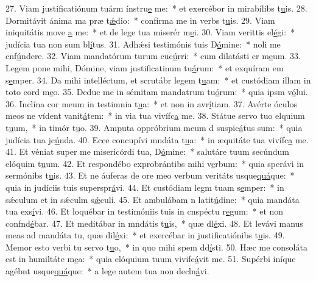 27. Viam justificatiónum tuárm ínstru\uline{e} me:~* et exercébor in mirabílibs t\uline{u}is.
28. Dormitávit ánima ma præ t\uline{ǽ}dio:~* confírma me in verbs t\uline{u}is.
29. Viam iniquitátis move \uline{a} me:~* et de lege tua miserér m\uline{e}i.
30. Viam verittis el\uline{é}gi:~* judícia tua non sum bl\uline{í}tus.
31. Adhǽsi testimónis tuis D\uline{ó}mine:~* noli me cnf\uline{ú}ndere.
32. Viam mandatórum turum cuc\uline{ú}rri:~* cum dilatásti cr m\uline{e}um.
33. Legem pone mihi, Dómine, viam justificatinum tu\uline{á}rum:~* et exquíram em s\uline{e}mper.
34. Da mihi intelléctum, et scrutábr legem t\uline{u}am:~* et custódiam illam in toto cord m\uline{e}o.
35. Deduc me in sémitam mandatrum tu\uline{ó}rum:~* quia ipsm v\uline{ó}lui.
36. Inclína cor meum in testimnia t\uline{u}a:~* et non in avr\uline{í}tiam.
37. Avérte óculos meos ne vídent vanit\uline{á}tem:~* in via tua vivífc\uline{a} me.
38. Státue servo tuo elquium t\uline{u}um,~* in timór t\uline{u}o.
39. Amputa oppróbrium meum d suspic\uline{á}tus sum:~* quia judícia tua jc\uline{ú}nda.
40. Ecce concupívi mndáta t\uline{u}a:~* in æquitáte tua vivífc\uline{a} me.
41. Et véniat super me misericórdi tua, D\uline{ó}mine:~* salutáre tuum secúndum elóquim t\uline{u}um.
42. Et respondébo exprobrántibs mihi v\uline{e}rbum:~* quia sperávi in sermónibs t\uline{u}is.
43. Et ne áuferas de ore meo verbum veritáts usque\uline{quá}que:~* quia in judíciis tuis superspr\uline{á}vi.
44. Et custódiam legm tuam s\uline{e}mper:~* in sǽculum et in sǽculm s\uline{ǽ}culi.
45. Et ambulábam n latit\uline{ú}dine:~* quia mandáta tua exs\uline{í}vi.
46. Et loquébar in testimóniis tuis in cnspéctu r\uline{e}gum:~* et non confnd\uline{é}bar.
47. Et meditábar in mndátis t\uline{u}is,~* quæ dl\uline{é}xi.
48. Et levávi manus meas ad mandáta tu, quæ dil\uline{é}xi:~* et exercébar in justificatiónibs t\uline{u}is.
49. Memor esto verbi tu servo t\uline{u}o,~* in quo mihi spem dd\uline{í}sti.
50. Hæc me consoláta est in humiltáte m\uline{e}a:~* quia elóquium tuum vivifc\uline{á}vit me.
51. Supérbi iníque agébnt usque\uline{quá}que:~* a lege autem tua non decln\uline{á}vi.

